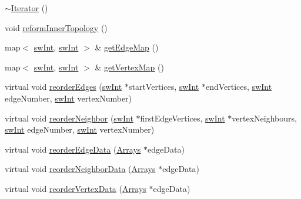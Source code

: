 \begin{DoxyCompactItemize}
\mbox{\hyperlink{classUNAT_1_1Iterator_a5fe65bc2a92032f20c20adf525e0aa26}{$\sim$\+Iterator}} ()
\item 
void \mbox{\hyperlink{classUNAT_1_1Iterator_ad25934bd952c01d0a82d3db33e46604a}{reform\+Inner\+Topology}} ()
\item 
map$<$ \mbox{\hyperlink{include_2swMacro_8h_a113cf5f6b5377cdf3fac6aa4e443e9aa}{sw\+Int}}, \mbox{\hyperlink{include_2swMacro_8h_a113cf5f6b5377cdf3fac6aa4e443e9aa}{sw\+Int}} $>$ \& \mbox{\hyperlink{classUNAT_1_1Iterator_ac5ce1cbee8e78efc52ba25d3da9eb9c8}{get\+Edge\+Map}} ()
\item 
map$<$ \mbox{\hyperlink{include_2swMacro_8h_a113cf5f6b5377cdf3fac6aa4e443e9aa}{sw\+Int}}, \mbox{\hyperlink{include_2swMacro_8h_a113cf5f6b5377cdf3fac6aa4e443e9aa}{sw\+Int}} $>$ \& \mbox{\hyperlink{classUNAT_1_1Iterator_ac05240478478b3d1aba6af28e364cf50}{get\+Vertex\+Map}} ()
\item 
virtual void \mbox{\hyperlink{classUNAT_1_1Iterator_a12e23a0188bf8c4a7d3de798ee9aa85f}{reorder\+Edges}} (\mbox{\hyperlink{include_2swMacro_8h_a113cf5f6b5377cdf3fac6aa4e443e9aa}{sw\+Int}} $\ast$start\+Vertices, \mbox{\hyperlink{include_2swMacro_8h_a113cf5f6b5377cdf3fac6aa4e443e9aa}{sw\+Int}} $\ast$end\+Vertices, \mbox{\hyperlink{include_2swMacro_8h_a113cf5f6b5377cdf3fac6aa4e443e9aa}{sw\+Int}} edge\+Number, \mbox{\hyperlink{include_2swMacro_8h_a113cf5f6b5377cdf3fac6aa4e443e9aa}{sw\+Int}} vertex\+Number)
\item 
virtual void \mbox{\hyperlink{classUNAT_1_1Iterator_ac54a79d677f7452d03a02fea6fb435f3}{reorder\+Neighbor}} (\mbox{\hyperlink{include_2swMacro_8h_a113cf5f6b5377cdf3fac6aa4e443e9aa}{sw\+Int}} $\ast$first\+Edge\+Vertices, \mbox{\hyperlink{include_2swMacro_8h_a113cf5f6b5377cdf3fac6aa4e443e9aa}{sw\+Int}} $\ast$vertex\+Neighbours, \mbox{\hyperlink{include_2swMacro_8h_a113cf5f6b5377cdf3fac6aa4e443e9aa}{sw\+Int}} edge\+Number, \mbox{\hyperlink{include_2swMacro_8h_a113cf5f6b5377cdf3fac6aa4e443e9aa}{sw\+Int}} vertex\+Number)
\item 
virtual void \mbox{\hyperlink{classUNAT_1_1Iterator_a9272c47e4e6c7636366c720de203edb6}{reorder\+Edge\+Data}} (\mbox{\hyperlink{structArrays}{Arrays}} $\ast$edge\+Data)
\item 
virtual void \mbox{\hyperlink{classUNAT_1_1Iterator_a45d6064d872b297ff6b69f86bc7c54df}{reorder\+Neighbor\+Data}} (\mbox{\hyperlink{structArrays}{Arrays}} $\ast$edge\+Data)
\item 
virtual void \mbox{\hyperlink{classUNAT_1_1Iterator_a14c39cea873162b0232f55d73b0519ae}{reorder\+Vertex\+Data}} (\mbox{\hyperlink{structArrays}{Arrays}} $\ast$edge\+Data)

\end{DoxyCompactItemize}
